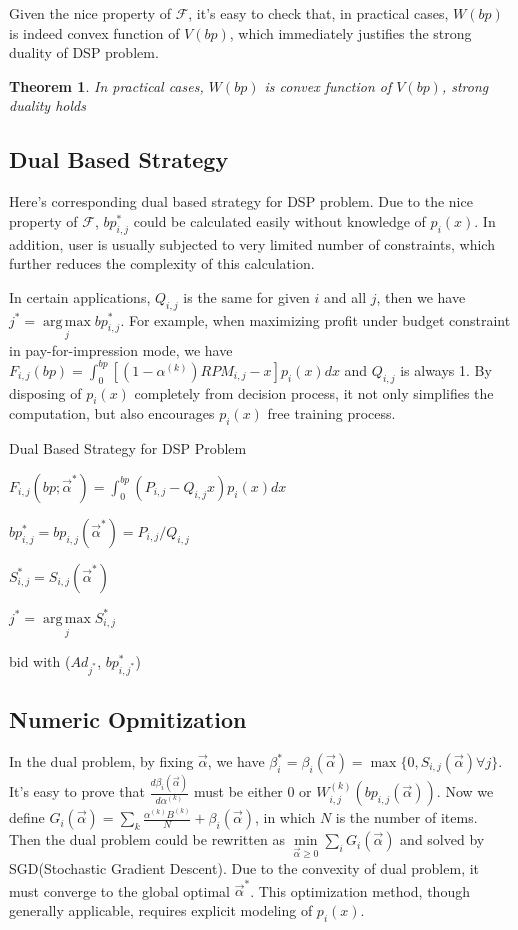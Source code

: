 \documentclass{article}
\newtheorem{theorem}{Theorem}[section]
\theoremstyle{definition}
\DeclareMathOperator*{\argmax}{arg\,max}
\newcommand{\sbp}{bp_{i,j}}
\newcommand{\sW}{W_{i,j}^{(k)}}
\newcommand{\sB}{B^{(k)}}
\newcommand{\sRPM}{RPM_{i,j}}
\newcommand{\salpha}{\alpha^{(k)}}
\newcommand{\sbeta}{\beta_i}
\newcommand{\sF}{F_{i,j}}
\newcommand{\sS}{S_{i,j}}
\newcommand{\sG}{G_i}
\newcommand{\valpha}{\vec{\alpha}}
\newcommand{\uff}{\mathscr{F}}
\begin{document}
\begin{CJK}{UTF8}{gbsn}
Given the nice property of $\uff$, it's easy to check that, in practical cases, $W(bp)$ is indeed convex function of $V(bp)$,
    which immediately justifies the strong duality of DSP problem.

\begin{theorem}
In practical cases, $W(bp)$ is convex function of $V(bp)$, strong duality holds
\end{theorem}

\subsection{Dual Based Strategy}

Here's corresponding dual based strategy for DSP problem.
Due to the nice property of $\uff$, $\sbp^*$ could be calculated easily without knowledge of $p_i(x)$.
In addition, user is usually subjected to very limited number of constraints, which further reduces the complexity of this calculation.

In certain applications, $Q_{i,j}$ is the same for given $i$ and all $j$, then we have $j^* = \argmax\limits_j \sbp^*$.
For example, when maximizing profit under budget constraint in pay-for-impression mode,
    we have $\sF(bp) = \int_0^{bp} [(1-\salpha)\sRPM-x]p_i(x)dx$ and $Q_{i,j}$ is always 1.
By disposing of $p_i(x)$ completely from decision process, it not only simplifies the computation,
    but also encourages $p_i(x)$ free training process.

\begin{algorithm}
\caption{Dual Based Strategy for DSP Problem}

{
  {
    $\sF(bp; \valpha^*) = \int_0^{bp} (P_{i,j}-Q_{i,j}x)p_i(x)dx$

    $\sbp^* = \sbp(\valpha^*) = P_{i,j}/Q_{i,j}$

    $\sS^* = \sS(\valpha^*)$
  }
  $j^* = \argmax\limits_j \sS^*$
  
   { bid with ($Ad_{j^*}$, $bp_{i,j^*}^*$) }
}
\end{algorithm}

\subsection{Numeric Opmitization}

In the dual problem, by fixing $\valpha$, we have $\sbeta^* = \sbeta(\valpha) = \max \{ 0, \sS(\valpha) \forall j \}$.
It's easy to prove that $\frac{d\sbeta(\valpha)}{d\salpha}$ must be either $0$ or $\sW(\sbp(\valpha))$.
Now we define $\sG(\valpha) = \sum\limits_k \frac{\salpha \sB}{N} + \sbeta(\valpha)$, in which $N$ is the number of items.
Then the dual problem could be rewritten as $\min\limits_{\valpha \ge 0} \sum\limits_i \sG(\valpha)$
    and solved by SGD(Stochastic Gradient Descent).
Due to the convexity of dual problem, it must converge to the global optimal $\valpha^*$.
This optimization method, though generally applicable, requires explicit modeling of $p_i(x)$.


\end{CJK}
\end{document}
